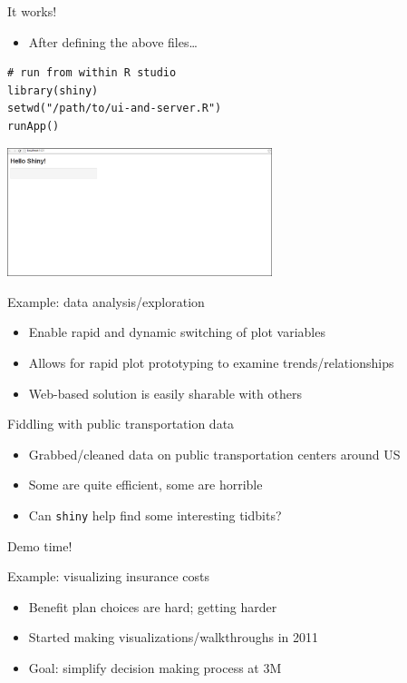 \documentclass[sans,aspectratio=169,presentation,bigger,fleqn]{beamer}
\begin{document}
\begin{frame}[fragile,label=sec-5]{It works!}
 \begin{itemize}
\item After defining the above files\ldots{}
\end{itemize}

\scriptsize
\begin{verbatim}
# run from within R studio
library(shiny)
setwd("/path/to/ui-and-server.R")
runApp()
\end{verbatim}

\begin{center}
\includegraphics[height=3.75cm]{./img/shiny-template.png}
\end{center}
\end{frame}
\begin{frame}[label=sec-6]{Example: data analysis/exploration}
\begin{itemize}
\item Enable rapid and dynamic switching of plot variables
\item Allows for rapid plot prototyping to examine trends/relationships
\item Web-based solution is easily sharable with others
\end{itemize}
\end{frame}
\begin{frame}[fragile,label=sec-7]{Fiddling with public transportation data}
 \begin{itemize}
\item Grabbed/cleaned data on public transportation centers around US
\item Some are quite efficient, some are horrible
\item Can \texttt{shiny} help find some interesting tidbits?
\end{itemize}

\pause

\alert{Demo time!}
\end{frame}
\begin{frame}[label=sec-8]{Example: visualizing insurance costs}
\begin{itemize}
\item Benefit plan choices are hard; getting harder
\item Started making visualizations/walkthroughs in 2011
\item Goal: simplify decision making process at 3M
\end{itemize}
\end{frame}
\end{document}
